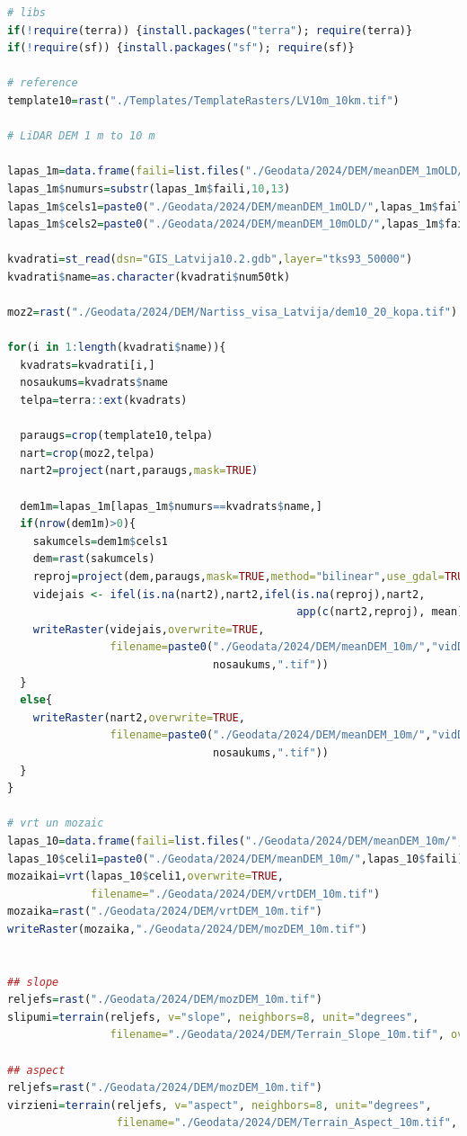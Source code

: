 \documentclass[
]{book}
\begin{document}
\begin{lstlisting}[language=R]
# libs
if(!require(terra)) {install.packages("terra"); require(terra)}
if(!require(sf)) {install.packages("sf"); require(sf)}

# reference
template10=rast("./Templates/TemplateRasters/LV10m_10km.tif")

# LiDAR DEM 1 m to 10 m 

lapas_1m=data.frame(faili=list.files("./Geodata/2024/DEM/meanDEM_1mOLD/",pattern="*.tif$"))
lapas_1m$numurs=substr(lapas_1m$faili,10,13)
lapas_1m$cels1=paste0("./Geodata/2024/DEM/meanDEM_1mOLD/",lapas_1m$faili)
lapas_1m$cels2=paste0("./Geodata/2024/DEM/meanDEM_10mOLD/",lapas_1m$faili)

kvadrati=st_read(dsn="GIS_Latvija10.2.gdb",layer="tks93_50000")
kvadrati$name=as.character(kvadrati$num50tk)

moz2=rast("./Geodata/2024/DEM/Nartiss_visa_Latvija/dem10_20_kopa.tif")

for(i in 1:length(kvadrati$name)){
  kvadrats=kvadrati[i,]
  nosaukums=kvadrats$name
  telpa=terra::ext(kvadrats)
  
  paraugs=crop(template10,telpa)
  nart=crop(moz2,telpa)
  nart2=project(nart,paraugs,mask=TRUE)
  
  dem1m=lapas_1m[lapas_1m$numurs==kvadrats$name,]
  if(nrow(dem1m)>0){
    sakumcels=dem1m$cels1
    dem=rast(sakumcels)
    reproj=project(dem,paraugs,mask=TRUE,method="bilinear",use_gdal=TRUE)
    videjais <- ifel(is.na(nart2),nart2,ifel(is.na(reproj),nart2,
                                             app(c(nart2,reproj), mean)))
    writeRaster(videjais,overwrite=TRUE,
                filename=paste0("./Geodata/2024/DEM/meanDEM_10m/","vidDEM_",
                                nosaukums,".tif"))
  }
  else{
    writeRaster(nart2,overwrite=TRUE,
                filename=paste0("./Geodata/2024/DEM/meanDEM_10m/","vidDEM_",
                                nosaukums,".tif"))
  }
}

# vrt un mozaic
lapas_10=data.frame(faili=list.files("./Geodata/2024/DEM/meanDEM_10m/",pattern="*.tif$"))
lapas_10$celi1=paste0("./Geodata/2024/DEM/meanDEM_10m/",lapas_10$faili)
mozaikai=vrt(lapas_10$celi1,overwrite=TRUE,
             filename="./Geodata/2024/DEM/vrtDEM_10m.tif")
mozaika=rast("./Geodata/2024/DEM/vrtDEM_10m.tif")
writeRaster(mozaika,"./Geodata/2024/DEM/mozDEM_10m.tif")


## slope
reljefs=rast("./Geodata/2024/DEM/mozDEM_10m.tif")
slipumi=terrain(reljefs, v="slope", neighbors=8, unit="degrees", 
                filename="./Geodata/2024/DEM/Terrain_Slope_10m.tif", overwrite=TRUE)  

## aspect 
reljefs=rast("./Geodata/2024/DEM/mozDEM_10m.tif")
virzieni=terrain(reljefs, v="aspect", neighbors=8, unit="degrees", 
                 filename="./Geodata/2024/DEM/Terrain_Aspect_10m.tif", overwrite=TRUE)
\end{lstlisting}
\end{document}
